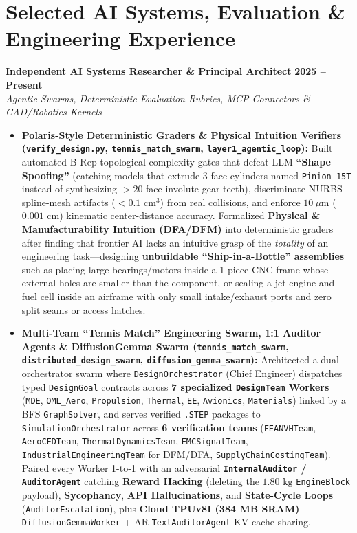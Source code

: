 \documentclass[10pt,letterpaper]{article}
\begin{document}
\section{Selected AI Systems, Evaluation \& Engineering Experience}

\textbf{Independent AI Systems Researcher \& Principal Architect} \hfill \textbf{2025 -- Present} \\
\textit{Agentic Swarms, Deterministic Evaluation Rubrics, MCP Connectors \& CAD/Robotics Kernels}
\begin{itemize}
    \item \textbf{Polaris-Style Deterministic Graders \& Physical Intuition Verifiers (\texttt{verify\_design.py}, \texttt{tennis\_match\_swarm}, \texttt{layer1\_agentic\_loop}):} Built automated B-Rep topological complexity gates that defeat LLM \textbf{``Shape Spoofing''} (catching models that extrude 3-face cylinders named \texttt{Pinion\_15T} instead of synthesizing $>20$-face involute gear teeth), discriminate NURBS spline-mesh artifacts ($<0.1\text{ cm}^3$) from real collisions, and enforce $10\ \mu\text{m}$ ($0.001\text{ cm}$) kinematic center-distance accuracy. Formalized \textbf{Physical \& Manufacturability Intuition (DFA/DFM)} into deterministic graders after finding that frontier AI lacks an intuitive grasp of the \textit{totality} of an engineering task---designing \textbf{unbuildable ``Ship-in-a-Bottle'' assemblies} such as placing large bearings/motors inside a 1-piece CNC frame whose external holes are smaller than the component, or sealing a jet engine and fuel cell inside an airframe with only small intake/exhaust ports and zero split seams or access hatches.
    \item \textbf{Multi-Team ``Tennis Match'' Engineering Swarm, 1:1 Auditor Agents \& DiffusionGemma Swarm (\texttt{tennis\_match\_swarm}, \texttt{distributed\_design\_swarm}, \texttt{diffusion\_gemma\_swarm}):} Architected a dual-orchestrator swarm where \texttt{DesignOrchestrator} (Chief Engineer) dispatches typed \texttt{DesignGoal} contracts across \textbf{7 specialized \texttt{DesignTeam} Workers} (\texttt{MDE}, \texttt{OML\_Aero}, \texttt{Propulsion}, \texttt{Thermal}, \texttt{EE}, \texttt{Avionics}, \texttt{Materials}) linked by a BFS \texttt{GraphSolver}, and serves verified \texttt{.STEP} packages to \texttt{SimulationOrchestrator} across \textbf{6 verification teams} (\texttt{FEANVHTeam}, \texttt{AeroCFDTeam}, \texttt{ThermalDynamicsTeam}, \texttt{EMCSignalTeam}, \texttt{IndustrialEngineeringTeam} for DFM/DFA, \texttt{SupplyChainCostingTeam}). Paired every Worker 1-to-1 with an adversarial \textbf{\texttt{InternalAuditor} / \texttt{AuditorAgent}} catching \textbf{Reward Hacking} (deleting the $1.80\text{ kg}$ \texttt{EngineBlock} payload), \textbf{Sycophancy}, \textbf{API Hallucinations}, and \textbf{State-Cycle Loops} (\texttt{AuditorEscalation}), plus \textbf{Cloud TPUv8I (384 MB SRAM)} \texttt{DiffusionGemmaWorker} + AR \texttt{TextAuditorAgent} KV-cache sharing.

\end{itemize}
\end{document}
